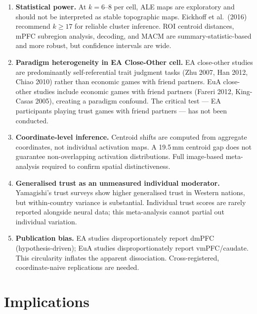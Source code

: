 \documentclass[11pt,a4paper]{report}
\begin{document}
\begin{enumerate}

\item \textbf{Statistical power.} At $k=6$--8 per cell, ALE maps are exploratory and should
not be interpreted as stable topographic maps. Eickhoff et al.\ (2016) recommend $k\geq17$
for reliable cluster inference. ROI centroid distances, mPFC subregion analysis, decoding,
and MACM are summary-statistic-based and more robust, but confidence intervals are wide.

\item \textbf{Paradigm heterogeneity in EA Close-Other cell.} EA close-other studies are
predominantly self-referential trait judgment tasks (Zhu 2007, Han 2012, Chiao 2010) rather
than economic games with friend partners. EuA close-other studies include economic games
with friend partners (Fareri 2012, King-Casas 2005), creating a paradigm confound. The
critical test --- EA participants playing trust games with friend partners --- has not been
conducted.

\item \textbf{Coordinate-level inference.} Centroid shifts are computed from aggregate
coordinates, not individual activation maps. A 19.5\,mm centroid gap does not guarantee
non-overlapping activation distributions. Full image-based meta-analysis required to confirm
spatial distinctiveness.

\item \textbf{Generalised trust as an unmeasured individual moderator.} Yamagishi's trust
surveys show higher generalised trust in Western nations, but within-country variance is
substantial. Individual trust scores are rarely reported alongside neural data; this
meta-analysis cannot partial out individual variation.

\item \textbf{Publication bias.} EA studies disproportionately report dmPFC
(hypothesis-driven); EuA studies disproportionately report vmPFC/caudate. This circularity
inflates the apparent dissociation. Cross-registered, coordinate-naive replications are needed.

\end{enumerate}

\chapter{Implications}
\end{document}
